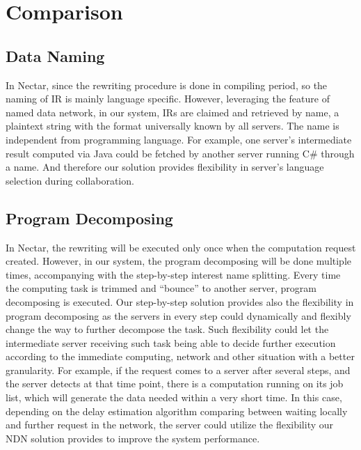 \section{Comparison}
\subsection{Data Naming}
In Nectar, since the rewriting procedure is done in compiling period, so the naming of IR is mainly language specific. However, leveraging the feature of named data network, in our system, IRs are claimed and retrieved by name, a plaintext string with the format universally known by all servers. The name is independent from programming language. For example, one server’s intermediate result computed via Java could be fetched by another server running C\# through a name. And therefore our solution provides flexibility in server’s language selection during collaboration.
\subsection{Program Decomposing}
In Nectar, the rewriting will be executed only once when the computation request created. However, in our system, the program decomposing will be done multiple times, accompanying with the step-by-step interest name splitting.  Every time the computing task is trimmed and “bounce” to another server, program decomposing is executed. Our step-by-step solution provides also the flexibility in program decomposing as the servers in every step could dynamically and flexibly change the way to further decompose the task. Such flexibility could let the intermediate server receiving such task being able to decide further execution according to the immediate computing, network and other situation with a better granularity. For example, if the request comes to a server after several steps, and the server detects at that time point, there is a computation running on its job list, which will generate the data needed within a very short time. In this case, depending on the delay estimation algorithm comparing between waiting locally and further request in the network, the server could utilize the flexibility our NDN solution provides to improve the system performance.
